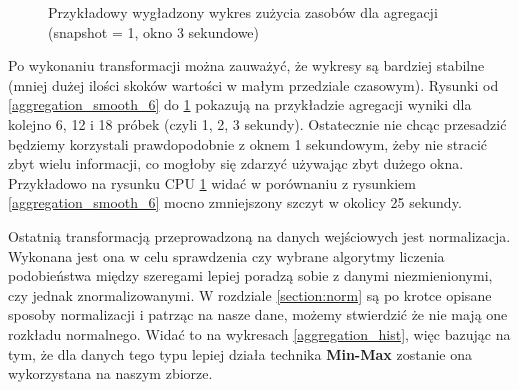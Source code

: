 \begin{figure}[H]
  \centering
  \hfill
  \caption{Przykładowy wygładzony wykres zużycia zasobów dla agregacji (snapshot = 1, okno 3 sekundowe)}
  \label{aggregation_smooth_18}
\end{figure}

Po wykonaniu transformacji można zauważyć, że wykresy są bardziej stabilne (mniej dużej ilości skoków wartości w małym przedziale czasowym). Rysunki od \ref{aggregation_smooth_6} do \ref{aggregation_smooth_18} pokazują na przykładzie agregacji wyniki dla kolejno 6, 12 i 18 próbek (czyli 1, 2, 3 sekundy). Ostatecznie nie chcąc przesadzić będziemy korzystali prawdopodobnie z oknem 1 sekundowym, żeby nie stracić zbyt wielu informacji, co mogłoby się zdarzyć używając zbyt dużego okna. Przykładowo na rysunku CPU \ref{aggregation_smooth_18} widać w porównaniu z rysunkiem \ref{aggregation_smooth_6} mocno zmniejszony szczyt w okolicy 25 sekundy.

Ostatnią transformacją przeprowadzoną na danych wejściowych jest normalizacja. Wykonana jest ona w celu sprawdzenia czy wybrane algorytmy liczenia podobieństwa między szeregami lepiej poradzą sobie z danymi niezmienionymi, czy jednak znormalizowanymi. W rozdziale \ref{section:norm} są po krotce opisane sposoby normalizacji i patrząc na nasze dane, możemy stwierdzić że nie mają one rozkładu normalnego. Widać to na wykresach \ref{aggregation_hist}, więc bazując na tym, że dla danych tego typu lepiej działa technika \textbf{Min-Max} zostanie ona wykorzystana na naszym zbiorze.

